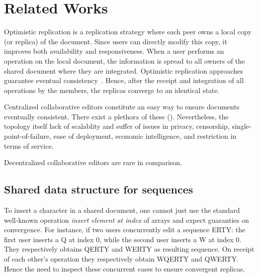 
\section{Related Works}
\label{sec:preliminaries}

\begin{asparadesc}
\item[Optimistic replication] is a replication strategy where each peer owns a
  local copy (or replica) of the document. Since users can directly modify this
  copy, it improves both availability and responsiveness. When a user performs
  an operation on the local document, the information is spread to all owners of
  the shared document where they are integrated. Optimistic replication
  approaches guarantee eventual consistency~\cite{bailis2013eventual}. Hence,
  after the receipt and integration of all operations by the members, the
  replicas converge to an identical state.
\end{asparadesc}

\begin{asparadesc}
\item[Centralized] collaborative editors constitute an easy way to ensure
  documents eventually consistent. There exist a plethora of these
  ().  Nevertheless, the topology itself lack of scalablity and
  suffer of issues in privacy, censorship, single-point-of-failure, ease of
  deployment, economic intelligence, and restriction in terms of service.
\end{asparadesc}

\begin{asparadesc}
\item[Decentralized] collaborative editors are rare in comparison. 
\end{asparadesc}

\subsection{Shared data structure for sequences}

To insert a character in a shared document, one cannot just use the standard
well-known operation \emph{insert element at index} of arrays and expect
guaranties on convergence. For instance, if two users concurrently edit a
sequence ERTY: the first user inserts a Q at index 0, while the second user
inserts a W at index 0. They respectively obtains QERTY and WERTY as resulting
sequence. On receipt of each other's operation they respectively obtain WQERTY
and QWERTY. Hence the need to inspect these concurrent cases to ensure
convergent replicas.

